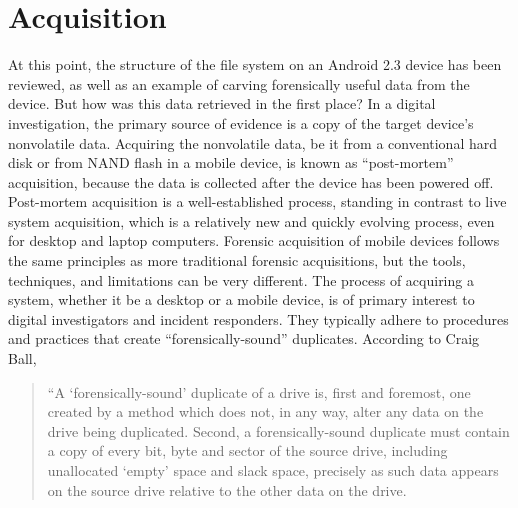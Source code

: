 \section{Acquisition}
At this point, the structure of the file system on an Android 2.3 device has been reviewed, as well as an example of carving
forensically useful data from the device. But how was this data retrieved in the first place? In a digital investigation, the
primary source of evidence is a copy of the target device's nonvolatile data.  Acquiring the nonvolatile data, be it from a
conventional hard disk or from NAND flash in a mobile device, is known as ``post-mortem'' acquisition, because the data is
collected after the device has been powered off.  Post-mortem acquisition is a well-established process, standing in contrast to
live system acquisition, which is a relatively new and quickly evolving process, even for desktop and laptop computers.  Forensic
acquisition of mobile devices follows the same principles as more traditional forensic acquisitions, but the tools, techniques, and
limitations can be very different. The process of acquiring a system, whether it be a desktop or a mobile device, is of primary
interest to digital investigators and incident responders. They typically adhere to procedures and practices that create
``forensically-sound'' duplicates.  According to Craig Ball, 

\begin{quote}
“A ‘forensically-sound’ duplicate of a drive is, first and foremost, one created by a method which does not, in any way, alter any data on the drive being duplicated. 
Second, a forensically-sound duplicate must contain a copy of every bit, byte and sector of the source drive, including unallocated ‘empty’ space and slack space, precisely as such data appears on the source drive relative to the other data on the drive. 
\cite{ball}
\end{quote}

